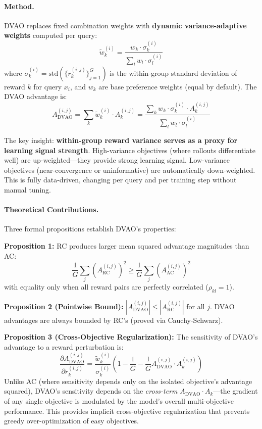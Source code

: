 \documentclass[11pt,a4paper]{article}
\begin{document}
\paragraph{Method.}
DVAO replaces fixed combination weights with \textbf{dynamic variance-adaptive weights} computed per query:
\begin{equation}
    \tilde{w}_k^{(i)} = \frac{w_k \cdot \sigma_k^{(i)}}{\sum_l w_l \cdot \sigma_l^{(i)}}
\end{equation}
where $\sigma_k^{(i)} = \mathrm{std}(\{r_k^{(i,j)}\}_{j=1}^G)$ is the within-group standard deviation of reward $k$ for query $x_i$, and $w_k$ are base preference weights (equal by default). The DVAO advantage is:
\begin{equation}
    A_{\mathrm{DVAO}}^{(i,j)} = \sum_k \tilde{w}_k^{(i)} \cdot A_k^{(i,j)} = \frac{\sum_k w_k \cdot \sigma_k^{(i)} \cdot A_k^{(i,j)}}{\sum_l w_l \cdot \sigma_l^{(i)}}
\end{equation}

The key insight: \textbf{within-group reward variance serves as a proxy for learning signal strength}. High-variance objectives (where rollouts differentiate well) are up-weighted---they provide strong learning signal. Low-variance objectives (near-convergence or uninformative) are automatically down-weighted. This is fully data-driven, changing per query and per training step without manual tuning.

\paragraph{Theoretical Contributions.}
Three formal propositions establish DVAO's properties:

\textbf{Proposition 1:} RC produces larger mean squared advantage magnitudes than AC:
\begin{equation}
    \frac{1}{G}\sum_j (A_{\mathrm{RC}}^{(i,j)})^2 \geq \frac{1}{G}\sum_j (A_{\mathrm{AC}}^{(i,j)})^2
\end{equation}
with equality only when all reward pairs are perfectly correlated ($\rho_{kl} = 1$).

\textbf{Proposition 2 (Pointwise Bound):} $|A_{\mathrm{DVAO}}^{(i,j)}| \leq |A_{\mathrm{RC}}^{(i,j)}|$ for all $j$. DVAO advantages are always bounded by RC's (proved via Cauchy-Schwarz).

\textbf{Proposition 3 (Cross-Objective Regularization):} The sensitivity of DVAO's advantage to a reward perturbation is:
\begin{equation}
    \frac{\partial A_{\mathrm{DVAO}}^{(i,j)}}{\partial r_k^{(i,j)}} = \frac{\tilde{w}_k^{(i)}}{\sigma_k^{(i)}} \left(1 - \frac{1}{G} - \frac{1}{G} A_{\mathrm{DVAO}}^{(i,j)} \cdot A_k^{(i,j)}\right)
\end{equation}
Unlike AC (where sensitivity depends only on the isolated objective's advantage squared), DVAO's sensitivity depends on the \emph{cross-term} $A_{\mathrm{DVAO}} \cdot A_k$---the gradient of any single objective is modulated by the model's overall multi-objective performance. This provides implicit cross-objective regularization that prevents greedy over-optimization of easy objectives.
\end{document}
